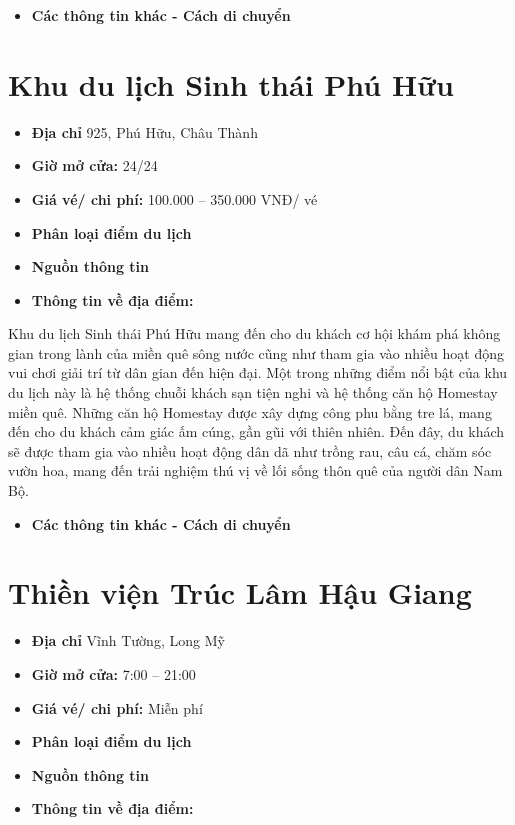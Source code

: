 \documentclass{article}
\begin{document}
\begin{itemize}
    \item{\textbf{Các thông tin khác - Cách di chuyển}}
\end{itemize}

\section{Khu du lịch Sinh thái Phú Hữu}
\begin{itemize}
    \item{\textbf{Địa chỉ}} 925, Phú Hữu, Châu Thành
    \item{\textbf{Giờ mở cửa:}} 24/24
    \item{\textbf{Giá vé/ chi phí:}} 100.000 – 350.000 VNĐ/ vé
    \item{\textbf{Phân loại điểm du lịch} }
    \item{\textbf{Nguồn thông tin}}
    \item{\textbf{Thông tin về địa điểm:}}
\end{itemize}
Khu du lịch Sinh thái Phú Hữu mang đến cho du khách cơ hội khám phá không gian trong lành của miền quê sông nước cũng như tham gia vào nhiều hoạt động vui chơi giải trí từ dân gian đến hiện đại.
Một trong những điểm nổi bật của khu du lịch này là hệ thống chuỗi khách sạn tiện nghi và hệ thống căn hộ Homestay miền quê. Những căn hộ Homestay được xây dựng công phu bằng tre lá, mang đến cho du khách cảm giác ấm cúng, gần gũi với thiên nhiên.
Đến đây, du khách sẽ được tham gia vào nhiều hoạt động dân dã như trồng rau, câu cá, chăm sóc vườn hoa, mang đến trải nghiệm thú vị về lối sống thôn quê của người dân Nam Bộ.

\begin{itemize}
    \item{\textbf{Các thông tin khác - Cách di chuyển}}
\end{itemize}

\section{Thiền viện Trúc Lâm Hậu Giang}
\begin{itemize}
    \item{\textbf{Địa chỉ}} Vĩnh Tường, Long Mỹ
    \item{\textbf{Giờ mở cửa:}} 7:00 – 21:00
    \item{\textbf{Giá vé/ chi phí:}} Miễn phí
    \item{\textbf{Phân loại điểm du lịch} }
    \item{\textbf{Nguồn thông tin}}
    \item{\textbf{Thông tin về địa điểm:}}
\end{itemize}
\end{document}

